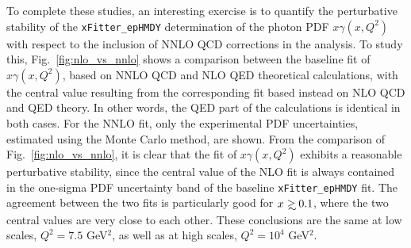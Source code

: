 To complete these studies, an interesting exercise is to quantify the perturbative stability of
the {\tt xFitter\_epHMDY}
determination of the photon PDF $x\gamma(x,Q^2)$ with respect to the inclusion
of NNLO QCD corrections in the analysis.
%
To study this, Fig.~\ref{fig:nlo_vs_nnlo} shows a
comparison between the baseline fit of $x\gamma(x,Q^2)$, based on NNLO
QCD and NLO QED theoretical calculations, with the central value resulting from the
corresponding fit
based instead on NLO QCD and QED theory.
%
In other words, the QED part of the calculations is identical in both cases.
%
For the NNLO fit, only the experimental PDF uncertainties, estimated
using the Monte Carlo method, are shown.
%
From the comparison of Fig.~\ref{fig:nlo_vs_nnlo}, it is clear that the
fit of $x\gamma(x,Q^2)$ exhibits a reasonable perturbative stability,
since the central value of the NLO fit is always contained in the
one-sigma PDF uncertainty band of the baseline {\tt xFitter\_epHMDY} fit.
%
The agreement between the two fits is particularly good for
$x\gsim 0.1$, where the two central values are very close to each
other.
%
These conclusions are the same at low scales, $Q^2=7.5$ GeV$^2$, as well
as at high scales, $Q^2=10^4$ GeV$^2$.

